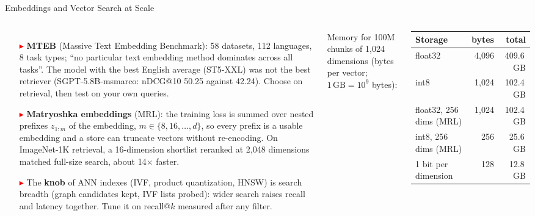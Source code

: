 \begin{frame}{Embeddings and Vector Search at Scale}
  \begin{columns}[T,onlytextwidth]
      \begin{itemize}\scriptsize\itemsep0.35em
        \item[\textcolor{red}{$\blacktriangleright$}] \textbf{MTEB} (Massive Text Embedding Benchmark): 58 datasets, 112 languages, 8 task types; ``no particular text embedding method dominates across all tasks''. The model with the best English average (ST5-XXL) was not the best retriever (SGPT-5.8B-msmarco: nDCG@10 50.25 against 42.24). Choose on retrieval, then test on your own queries.
        \item[\textcolor{red}{$\blacktriangleright$}] \textbf{Matryoshka embeddings} (MRL): the training loss is summed over nested prefixes $z_{1:m}$ of the embedding, $m \in \{8, 16, \dots, d\}$, so every prefix is a usable embedding and a store can truncate vectors without re-encoding. On ImageNet-1K retrieval, a 16-dimension shortlist reranked at 2{,}048 dimensions matched full-size search, about 14$\times$ faster.
        \item[\textcolor{red}{$\blacktriangleright$}] The \textbf{knob} of ANN indexes (IVF, product quantization, HNSW) is search breadth (graph candidates kept, IVF lists probed): wider search raises recall and latency together. Tune it on recall@$k$ measured after any filter.
      \end{itemize}
      {\centering
      {\scriptsize Memory for 100M chunks of 1{,}024 dimensions (bytes per vector; $1\,\text{GB} = 10^9$ bytes):}\\[0.2em]
      {\scriptsize
      \begin{tabular}{lrr}
        \toprule
        Storage & bytes & total \\
        \midrule
        float32 & 4{,}096 & 409.6\,GB \\
        int8 & 1{,}024 & 102.4\,GB \\
        float32, 256 dims (MRL) & 1{,}024 & 102.4\,GB \\
        int8, 256 dims (MRL) & 256 & 25.6\,GB \\
        1 bit per dimension & 128 & 12.8\,GB \\
        \bottomrule
      \end{tabular}\par}\par}
      \vspace{0.3em}

\end{columns}
\end{frame}
